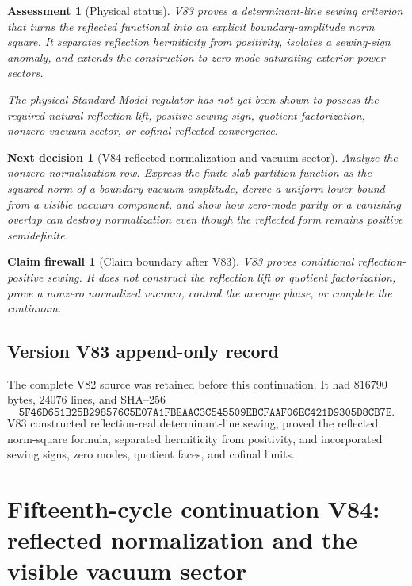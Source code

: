 \documentclass[11pt]{article}
\newtheorem{firewall}[theorem]{Claim firewall}
\newtheorem{decision}[theorem]{Next decision}
\newtheorem{assessment}[theorem]{Assessment}
\theoremstyle{remark}
\begin{document}
\begin{assessment}[Physical status]
\label{ass:v15v83-status}
V83 proves a determinant-line sewing criterion that turns the
reflected functional into an explicit boundary-amplitude norm
square.  It separates reflection hermiticity from positivity,
isolates a sewing-sign anomaly, and extends the construction to
zero-mode-saturating exterior-power sectors.

The physical Standard Model regulator has not yet been shown to
possess the required natural reflection lift, positive sewing
sign, quotient factorization, nonzero vacuum sector, or cofinal
reflected convergence.
\end{assessment}

\begin{decision}[V84 reflected normalization and vacuum sector]
\label{dec:v15v83-next}
Analyze the nonzero-normalization row.  Express the finite-slab
partition function as the squared norm of a boundary vacuum
amplitude, derive a uniform lower bound from a visible vacuum
component, and show how zero-mode parity or a vanishing overlap can
destroy normalization even though the reflected form remains
positive semidefinite.
\end{decision}

\begin{firewall}[Claim boundary after V83]
\label{fire:v15v83}
V83 proves conditional reflection-positive sewing.  It does not
construct the reflection lift or quotient factorization, prove a
nonzero normalized vacuum, control the average phase, or complete
the continuum.
\end{firewall}

\section*{Version V83 append-only record}
The complete V82 source was retained before this continuation.  It
had \(816790\) bytes, \(24076\) lines, and SHA--256
\[
 \texttt{5F46D651B25B298576C5E07A1FBEAAC3C545509EBCFAAF06EC421D9305D8CB7E}.
\]
V83 constructed reflection-real determinant-line sewing, proved
the reflected norm-square formula, separated hermiticity from
positivity, and incorporated sewing signs, zero modes, quotient
faces, and cofinal limits.

\chapter{Fifteenth-cycle continuation V84: reflected normalization and the visible vacuum sector}
\label{sec:v15v84}
\end{document}
